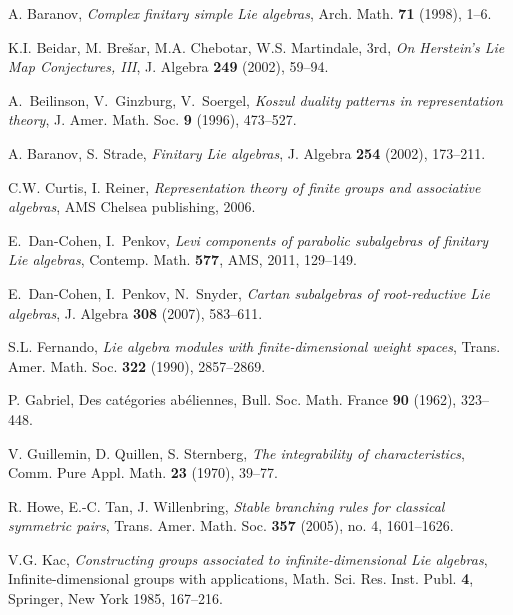 \documentclass{amsart}
\theoremstyle{definition}
\numberwithin{equation}{section}
\begin{document}
\begin{thebibliography}{}

A. Baranov, \textit{Complex finitary simple Lie algebras}, Arch. Math. \textbf{71} (1998), 1--6.

K.I. Beidar, M. Bre\v sar, M.A. Chebotar, W.S. Martindale, 3rd, \textit{On Herstein's Lie Map Conjectures, III}, J. Algebra  \textbf{249} (2002), 59--94. 

A.~Beilinson, V.~Ginzburg, V.~Soergel, \textit{Koszul duality patterns in representation theory}, J. Amer. Math. Soc. \textbf{9} (1996), 473--527.

A. Baranov, S. Strade, \textit{Finitary Lie algebras}, J. Algebra \textbf{254} (2002), 173--211.

C.W. Curtis, I. Reiner, \textit{Representation theory of finite
  groups and associative algebras}, AMS Chelsea publishing, 2006.



E.~Dan-Cohen, I.~Penkov, \textit{Levi components of parabolic
  subalgebras of finitary Lie algebras}, Contemp. Math. \textbf{577},  AMS, 2011, 129--149.

E.~Dan-Cohen, I.~Penkov, N.~Snyder, \textit{Cartan subalgebras of root-reductive Lie algebras}, J. Algebra \textbf{308} (2007), 583--611. 

S.L. Fernando, \textit{Lie algebra modules with finite-dimensional weight spaces}, Trans. Amer. Math. Soc. \textbf{322} (1990), 2857--2869.

 P. Gabriel, Des cat\'egories ab\'eliennes, Bull. Soc. Math. France \textbf{90} (1962), 323--448.

V. Guillemin, D. Quillen, S. Sternberg, \textit{The integrability of characteristics}, Comm. Pure Appl. Math. \textbf{23} (1970), 39--77.

R. Howe, E.-C. Tan, J. Willenbring, \textit{Stable branching rules for classical symmetric pairs}, Trans. Amer. Math. Soc. \textbf{357} (2005), no. 4, 1601--1626.

  V.G. Kac, \textit{Constructing groups associated to infinite-dimensional Lie algebras}, Infinite-dimensional groups with applications,  Math. Sci. Res. Inst. Publ. \textbf{4}, Springer, New York 1985, 167--216.


\end{thebibliography}
\end{document}
